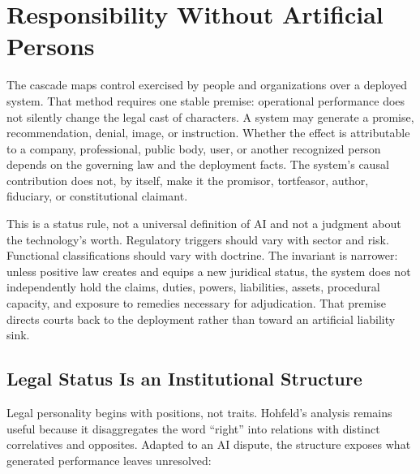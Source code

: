 \section{Responsibility Without Artificial Persons}
\label{sec:definitions}

The cascade maps control exercised by people and organizations over a deployed system. That method requires one stable premise: operational performance does not silently change the legal cast of characters. A system may generate a promise, recommendation, denial, image, or instruction. Whether the effect is attributable to a company, professional, public body, user, or another recognized person depends on the governing law and the deployment facts. The system's causal contribution does not, by itself, make it the promisor, tortfeasor, author, fiduciary, or constitutional claimant.

This is a status rule, not a universal definition of AI and not a judgment about the technology's worth. Regulatory triggers should vary with sector and risk. Functional classifications should vary with doctrine. The invariant is narrower: unless positive law creates and equips a new juridical status, the system does not independently hold the claims, duties, powers, liabilities, assets, procedural capacity, and exposure to remedies necessary for adjudication. That premise directs courts back to the deployment rather than toward an artificial liability sink.

\subsection{Legal Status Is an Institutional Structure}

Legal personality begins with positions, not traits. Hohfeld's analysis remains useful because it disaggregates the word ``right'' into relations with distinct correlatives and opposites. Adapted to an AI dispute, the structure exposes what generated performance leaves unresolved:

